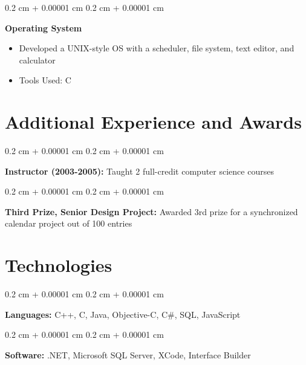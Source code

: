 \documentclass[10pt, letterpaper]{article}
\newenvironment{highlights}{
    \begin{itemize}[
        topsep=0.10 cm,
        parsep=0.10 cm,
        partopsep=0pt,
        itemsep=0pt,
        leftmargin=0.4 cm + 10pt
    ]
}{
    \end{itemize}
} %
\newenvironment{onecolentry}{
    \begin{adjustwidth}{
        0.2 cm + 0.00001 cm
    }{
        0.2 cm + 0.00001 cm
    }
}{
    \end{adjustwidth}
} %
\newenvironment{twocolentry}[2][]{
    \onecolentry
    \def\secondColumn{#2}
    \setcolumnwidth{\fill, 4.5 cm}
    \begin{paracol}{2}
}{
    \switchcolumn \raggedleft \secondColumn
    \end{paracol}
    \endonecolentry
} %
\begin{document}
        \vspace{0.2 cm}

        \begin{twocolentry}{
            2002
        }
            \textbf{Operating System}
            \begin{highlights}
                \item Developed a UNIX-style OS with a scheduler, file system, text editor, and calculator
                \item Tools Used: C
            \end{highlights}
        \end{twocolentry}



    
    \section{Additional Experience and Awards}



        
        \begin{onecolentry}
            \textbf{Instructor (2003-2005):} Taught 2 full-credit computer science courses
        \end{onecolentry}

        \vspace{0.2 cm}

        \begin{onecolentry}
            \textbf{Third Prize, Senior Design Project:} Awarded 3rd prize for a synchronized calendar project out of 100 entries
        \end{onecolentry}


    
    \section{Technologies}



        
        \begin{onecolentry}
            \textbf{Languages:} C++, C, Java, Objective-C, C\#, SQL, JavaScript
        \end{onecolentry}

        \vspace{0.2 cm}

        \begin{onecolentry}
            \textbf{Software:} .NET, Microsoft SQL Server, XCode, Interface Builder
        \end{onecolentry}


    
\end{document}
